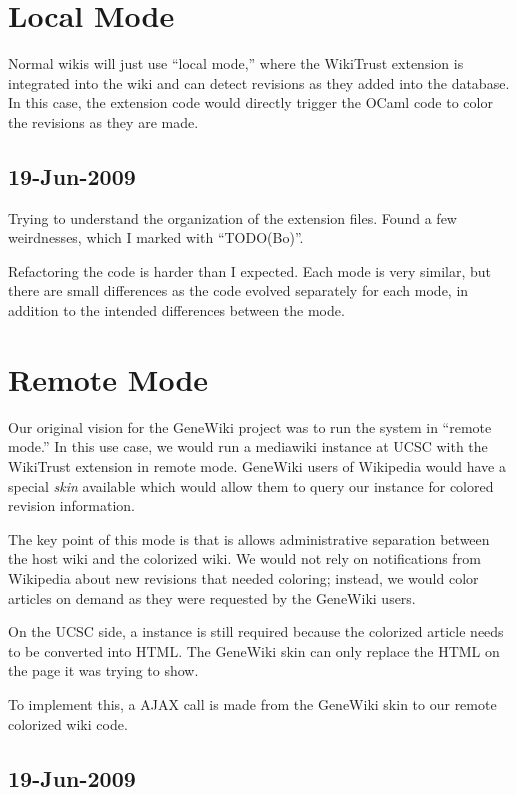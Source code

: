 \section{Local Mode}

Normal wikis will just use ``local mode,'' where the WikiTrust extension
is integrated into the wiki and can detect revisions as they added
into the database.
In this case, the extension code would directly trigger the
OCaml code to color the revisions as they are made.

\subsection{19-Jun-2009}

Trying to understand the organization of the extension files.  Found a few weirdnesses, which I marked with ``TODO(Bo)''.

Refactoring the code is harder than I expected.
Each mode is very similar, but there are small differences
as the code evolved separately for each mode,
in addition to the intended differences between the mode.


\section{Remote Mode}

Our original vision for the GeneWiki project was to run the
system in ``remote mode.''
In this use case, we would run a mediawiki instance at UCSC
with the WikiTrust extension in remote mode.
GeneWiki users of Wikipedia would have a special \textit{skin}
available which would allow them to query our instance for
colored revision information.

The key point of this mode is that is allows administrative separation
between the host wiki and the colorized wiki.
We would not rely on notifications from Wikipedia about new revisions
that needed coloring; instead, we would color articles
on demand as they were requested by the GeneWiki users.

On the UCSC side, a  instance is still required
because the colorized article needs to be converted into HTML.
The GeneWiki skin can only replace the HTML on the page it was
trying to show.

To implement this, a  AJAX call is made
from the GeneWiki skin to our remote colorized wiki code.

\subsection{19-Jun-2009}

